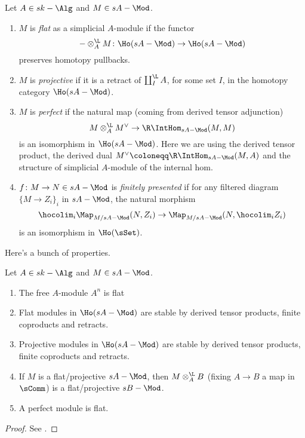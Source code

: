         \begin{defn}
            \label{defn:module_homotopical_properties}
            Let $A \in sk-\Alg$ and $M \in sA-\Mod$. 
            \begin{enumerate}
                \item $M$ is \emph{flat} as a simplicial $A$-module if the functor \[ - \otimes_A^{\L} M\colon \Ho(sA-\Mod) \to \Ho(sA-\Mod) \] preserves homotopy pullbacks.
                \item $M$ is \emph{projective} if it is a retract of $\coprod_I^{\L} A$, for some set $I$, in the homotopy category $\Ho(sA-\Mod)$.
                \item $M$ is \emph{perfect} if the natural map (coming from derived tensor adjunction) \[M \otimes_A^{\L} M^{\vee} \to \R\IntHom_{sA-\Mod}(M, M) \] is an isomorphism in $\Ho(sA-\Mod)$. Here we are using the derived tensor product, the derived dual $M^{\vee}\coloneqq \R\IntHom_{sA-\Mod}(M, A)$ and the structure of simplicial $A$-module of the internal hom.
                \item $f\colon M \to N \in sA-\Mod$ is \emph{finitely presented} if for any filtered diagram $\{M \to Z_i\}_i$ in $sA-\Mod$, the natural morphism \[\hocolim_i \Map_{M/sA-\Mod}(N, Z_i) \to \Map_{M/sA-\Mod}(N, \hocolim_i Z_i) \] is an isomorphism in $\Ho(\sSet)$.
            \end{enumerate}
        \end{defn}

        Here's a bunch of properties.
        \begin{prop}
            \label{prop:properties_homotopical_modules}
            Let $A \in sk-\Alg$ and $M \in sA-\Mod$. 
            \begin{enumerate}
                \item The free $A$-module $A^n$ is flat
                \item Flat modules in $\Ho(sA-\Mod)$ are stable by derived tensor products, finite coproducts and retracts.
                \item Projective modules in $\Ho(sA-\Mod)$ are stable by derived tensor products, finite coproducts and retracts.
                \item If $M$ is a flat/projective $sA-\Mod$, then $M \otimes_A^{\L} B$ (fixing $A \to B$ a map in $\sComm$) is a flat/projective $sB-\Mod$.
                \item A perfect module is flat.
            \end{enumerate}
        \end{prop}
        \begin{proof}
            See \cite[Prop~1.2.4.2]{ToVe:hag2}.
        \end{proof}

